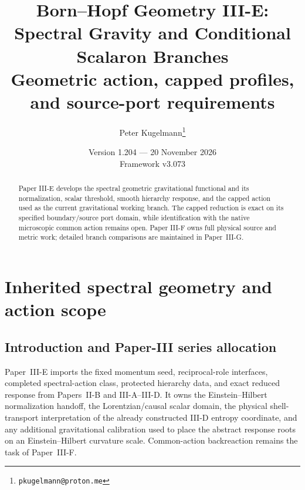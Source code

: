 \documentclass[12pt,a4paper]{article}
\title{\textbf{Born--Hopf Geometry III-E: Spectral Gravity and Conditional Scalaron Branches}\\[0.5em]
\large Geometric action, capped profiles, and source-port requirements}
\author{Peter Kugelmann\thanks{\texttt{pkugelmann@proton.me}}}
\date{Version 1.204 --- 20 November 2026 \\ Framework v3.073}
\begin{document}
\maketitle
\begin{abstract}
Paper III-E develops the spectral geometric gravitational
functional and its normalization, scalar threshold, smooth hierarchy response,
and the capped action used as the current gravitational working branch.
The capped reduction is exact on its specified boundary/source port domain,
while identification with the native microscopic common action remains open. Paper III-F owns full physical source and metric
work; detailed branch comparisons are maintained in Paper~III-G.
\end{abstract}
\tableofcontents
\clearpage

\section{Inherited spectral geometry and action scope}
\label{paper3e:sec:organized-scope}
\subsection{Introduction and Paper-III series allocation}
\label{p3e:sec:series-allocation}
Paper~III-E imports the fixed momentum seed, reciprocal-role interfaces,
completed spectral-action class, protected hierarchy data, and exact reduced
response from Papers~II-B and III-A--III-D.  It owns the Einstein--Hilbert
normalization handoff, the Lorentzian/causal scalar domain, the physical
shell-transport interpretation of the already constructed III-D entropy
coordinate, and any additional gravitational calibration used to place the
abstract response roots on an Einstein--Hilbert curvature scale.  Common-action
backreaction remains the task of Paper~III-F.
\end{document}
